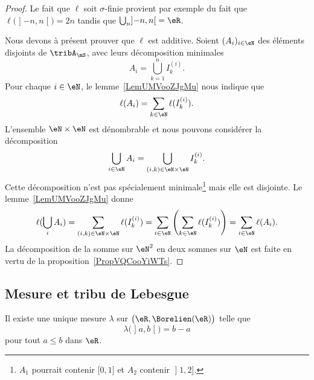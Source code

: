 \begin{proof}
	Le fait que \( \ell\) soit \( \sigma\)-finie provient par exemple du fait que \( \ell\big( \mathopen] -n , n \mathclose[ \big)=2n\) tandis que \( \bigcup_n\mathopen] -n , n \mathclose[=\eR\).

	Nous devons à présent prouver que \( \ell\) est additive. Soient \( (A_i)_{i\in \eN}\) des éléments disjoints de \( \tribA_{\mS}\), avec leurs décomposition minimales
	\begin{equation}
		A_i=\bigcup_{k=1}^nI^{(i)}_k.
	\end{equation}
	Pour chaque \( i\in \eN\), le lemme~\ref{LemUMVooZJgMu} nous indique que
	\begin{equation}
		\ell(A_i)=\sum_{k\in \eN}\ell(I^{(i)}_k).
	\end{equation}
	L'ensemble \( \eN\times \eN\) est dénombrable et nous pouvons considérer la décomposition
	\begin{equation}
		\bigcup_{i\in \eN}A_i=\bigcup_{(i,k)\in \eN\times \eN}I^{(i)}_k.
	\end{equation}
	Cette décomposition n'est pas spécialement minimale\footnote{\(  A_1\) pourrait contenir \(  \mathopen[ 0 , 1 \mathclose]\) et \(  A_2\) contenir \(  \mathopen] 1 , 2 \mathclose]\).} mais elle est disjointe.
	Le lemme~\ref{LemUMVooZJgMu} donne
	\begin{equation}
		\ell(\bigcup_i A_i)=\sum_{(i,k)\in \eN\times \eN}\ell(I_k^{(i)})=\sum_{i\in \eN}\left( \sum_{k\in \eN}\ell(I^{(i)}_k)\right)=\sum_{i\in \eN}\ell(A_i).
	\end{equation}
	La décomposition de la somme sur \( \eN^2\) en deux sommes sur \( \eN\) est faite en vertu de la proposition~\ref{PropVQCooYiWTs}.
\end{proof}

\subsection{Mesure et tribu de Lebesgue}

\begin{theorem} \label{ThoDESooEyDOe}
	Il existe une unique mesure \( \lambda\) sur \( \big( \eR,\Borelien(\eR) \big)\) telle que
	\begin{equation}
		\lambda\big( \mathopen] a , b \mathclose[ \big)=b-a
	\end{equation}
	pour tout \( a\leq b\) dans \( \eR\).
\end{theorem}

